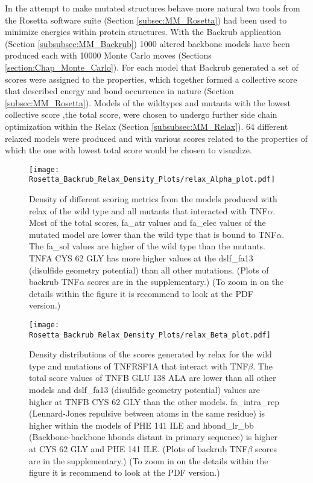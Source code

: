	In the attempt to make mutated structures behave more natural two tools from the Rosetta software suite (Section \ref{subsec:MM_Rosetta}) had been used to minimize energies within protein structures. 
	With the Backrub application (Section \ref{subsubsec:MM_Backrub}) 1000 altered backbone models have been produced each with 10000 Monte Carlo moves (Sections \ref{section:Chap_Monte_Carlo}). 
	For each model that Backrub generated a set of scores were assigned to the properties, which together formed a collective score that described energy and bond occurrence in nature (Section \ref{subsec:MM_Rosetta}). 
	Models of the wildtypes and mutants with the lowest collective score ,the total score, were chosen to undergo further side chain optimization within the Relax (Section \ref{subsubsec:MM_Relax}). 
	64 different relaxed models were produced and with various scores related to the properties of which the one with lowest total score would be chosen to visualize. 
	
	\begin{figure}[!ht]
		\centering
		\texttt{[image: Rosetta\_Backrub\_Relax\_Density\_Plots/relax\_Alpha\_plot.pdf]}
		\caption[TNFRSF1A homotrimer with TNF$\alpha$ homotrimer relax density plots]{Density of different scoring metrics from the models produced with relax of the wild type and all mutants that interacted with TNF$\alpha$. Most of the total scores, fa\_atr values and fa\_elec values of the mutated model are lower than the wild type that is bound to TNF$\alpha$. The fa\_sol values are higher of the wild type than the mutants. TNFA CYS 62 GLY has more higher values at the dslf\_fa13 (disulfide geometry potential) than all other mutations. (Plots of backrub TNF$\alpha$ scores are in the supplementary.) (To zoom in on the details within the figure it is recommend to look at the PDF version.)}
		\label{fig:relax_TNFA_scores}
	\end{figure}

	\newpage
		
	\begin{figure}[!ht]
		\centering
		\texttt{[image: Rosetta\_Backrub\_Relax\_Density\_Plots/relax\_Beta\_plot.pdf]}
		\caption[TNFRSF1A homotrimer with TNF$\beta$ homotrimer relax density plots]{Density distributions of the scores generated by relax for the wild type and mutations of TNFRSF1A that interact with TNF$\beta$. The total score values of TNFB GLU 138 ALA are lower than all other models and dslf\_fa13 (disulfide geometry potential) values are higher at TNFB CYS 62 GLY than the other models. fa\_intra\_rep (Lennard-Jones repulsive between atoms in the same residue) is higher within the models of PHE 141 ILE and hbond\_lr\_bb (Backbone-backbone hbonds distant in primary sequence) is higher at CYS 62 GLY and PHE 141 ILE.
		(Plots of backrub TNF$\beta$ scores are in the supplementary.) (To zoom in on the details within the figure it is recommend to look at the PDF version.)}
		\label{fig:relax_TNFB_scores}
	\end{figure}

